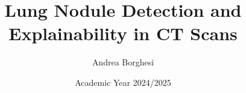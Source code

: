 \documentclass[a4paper]{report}
\title{Lung Nodule Detection and Explainability in CT Scans}
\author{Andrea Borghesi}
\date{Academic Year 2024/2025}
\begin{document}
\maketitlepage
\end{document}
